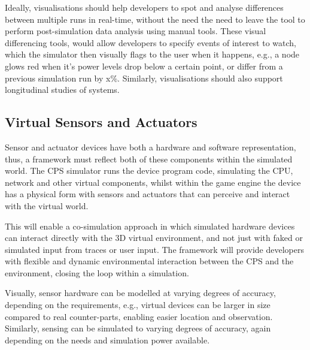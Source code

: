 Ideally, visualisations should help developers to spot and analyse differences between multiple runs in real-time, without the need the need to leave the tool to perform post-simulation data analysis using manual tools. These visual differencing tools, would allow developers to specify events of interest to watch, which the simulator then visually flags to the user when it happens, e.g., a node glows red when it's power levels drop below a certain point, or differ from a previous simulation run by x\%. Similarly, visualisations should also support longitudinal studies of systems.



\subsection{Virtual Sensors and Actuators}
\label{sub:requirements_Virtual Sensors and Actuators}
Sensor and actuator devices have both a hardware and software representation, thus, a framework must reflect both of these components within the simulated world. The CPS simulator runs the device program code, simulating the CPU, network and other virtual components, whilst within the game engine the device has a physical form with sensors and actuators that can perceive and interact with the virtual world. 

This will enable a co-simulation approach in which simulated hardware devices can interact directly with the 3D virtual environment, and not just with faked or simulated input from traces or user input. The framework will provide developers with flexible and dynamic environmental interaction between the CPS and the environment, closing the loop within a simulation. 

Visually, sensor hardware can be modelled at varying degrees of accuracy, depending on the requirements, e.g., virtual devices can be larger in size compared to real counter-parts, enabling easier location and observation. Similarly, sensing can be simulated to varying degrees of accuracy, again depending on the needs and simulation power available. 

